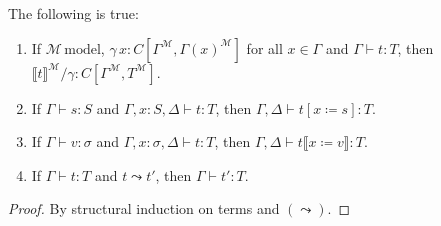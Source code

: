\begin{theorem}
    The following is true:
    \begin{enumerate}
        \item If $\mathcal{M}\,\mathrm{model}$,
            $\gamma\,x:C[\Gamma^\mathcal{M},
            \Gamma(x)^\mathcal{M}]$ for all $x\in\Gamma$
            and $\Gamma\vdash t:T$, then $\llbracket t
            \rrbracket^\mathcal{M}/\gamma:
            C[\Gamma^\mathcal{M},T^\mathcal{M}]$.
        \item If $\Gamma\vdash s:S$ and
            $\Gamma,x:S,\Delta\vdash t:T$, then
            $\Gamma,\Delta\vdash t[x\coloneqq s]:T$.
        \item If $\Gamma\vdash v:\sigma$ and
            $\Gamma,x:\sigma,\Delta\vdash t:T$, then
            $\Gamma,\Delta\vdash t\llbracket
            x\coloneqq v\rrbracket:T$.
        \item If $\Gamma\vdash t:T$ and $t\leadsto t'$,
            then $\Gamma\vdash t':T$.
    \end{enumerate}
\end{theorem}
\begin{proof}
    By structural induction on terms and $(\leadsto)$.
\end{proof}

